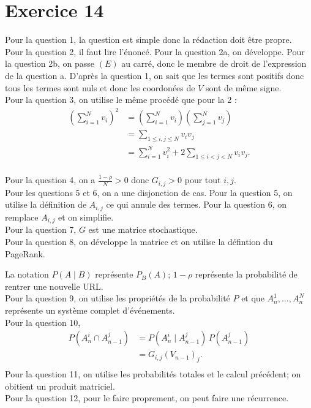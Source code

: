 \part{Exercice 14}

Pour la question 1, la question est simple donc la rédaction doit être propre.\\
Pour la question 2, il faut lire l'énoncé. Pour la question 2a, on développe. Pour la question 2b, on passe $(E)$ au carré, donc le membre de droit de l'expression de la question a. D'après la question 1, on sait que les termes sont positifs donc tous les termes sont nuls et donc les coordonées de $V$ sont de même signe.\\
Pour la question 3, on utilise le même procédé que pour la 2 :
\begin{align*}
	\left( \sum_{i=1}^N v_i \right)^2 &= \left( \sum_{i=1}^N v_i \right) \left( \sum_{j=1}^N v_j \right)\\
	&= \sum_{1 \le i,j \le N} v_i v_j \\
	&= \sum_{i=1}^N v_i^2 + 2\sum_{1\le i<j < N} v_i v_j. \\
\end{align*}

Pour la question 4, on a $\frac{1-\rho}{N} > 0$ donc $G_{i,j} > 0$ pour tout $i,j$.\\
Pour les questions 5 et 6, on a une disjonction de cas.
Pour la question 5, on utilise la définition de $A_{i,j}$ ce qui annule des termes.
Pour la question 6, on remplace $A_{i,j}$ et on simplifie.\\
Pour la question 7, $G$ est une matrice stochastique.\\
Pour la question 8, on développe la matrice et on utilise la défintion du PageRank.

La notation $P(A \mid B)$ représente $P_B(A)$; $1-\rho$ représente la probabilité de rentrer une nouvelle URL.\\
Pour la question 9, on utilise les propriétés de la probabilité $P$ et que $A_n^1,\ldots,A_n^N$ représente un système complet d'événements.\\
Pour la question 10,
\begin{align*}
	P(A_n^i \cap A_{n-1}^j) &= P(A_n^i \mid A_{n-1}^j)\,P(A_{n-1}^j) \\
	&= G_{i,j}(V_{n-1})_j. \\
\end{align*}
Pour la question 11, on utilise les probabilités totales et le calcul précédent; on obitient un produit matriciel.\\
Pour la question 12, pour le faire proprement, on peut faire une récurrence.

